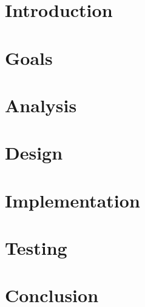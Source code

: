 \chapter{Introduction}
\setcounter{page}{1}



\chapter{Goals}



\chapter{Analysis}



\chapter{Design}



\chapter{Implementation}



\chapter{Testing}



\chapter{Conclusion}



